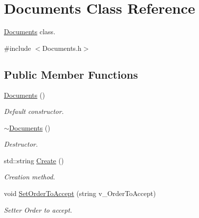 \hypertarget{class_documents}{}\section{Documents Class Reference}
\label{class_documents}


\hyperlink{class_documents}{Documents} class.  




{\ttfamily \#include $<$Documents.\+h$>$}

\subsection*{Public Member Functions}
\begin{DoxyCompactItemize}
\item 
\mbox{\label{class_documents_a52daba61782250a38f4964910a961793}} 
\hyperlink{class_documents_a52daba61782250a38f4964910a961793}{Documents} ()
\begin{DoxyCompactList}\small\item\em Default constructor. \end{DoxyCompactList}\item 
\mbox{\label{class_documents_a67e92e6e30aeff0300ac69e55bd2aab0}} 
\hyperlink{class_documents_a67e92e6e30aeff0300ac69e55bd2aab0}{$\sim$\+Documents} ()
\begin{DoxyCompactList}\small\item\em Destructor. \end{DoxyCompactList}\item 
\mbox{\label{class_documents_a524740a8fbe3933562d63c9999c0cb53}} 
std\+::string \hyperlink{class_documents_a524740a8fbe3933562d63c9999c0cb53}{Create} ()
\begin{DoxyCompactList}\small\item\em Creation method. \end{DoxyCompactList}\item 
\mbox{\label{class_documents_aa101f46efd37c76443f90822407bcaa3}} 
void \hyperlink{class_documents_aa101f46efd37c76443f90822407bcaa3}{Set\+Order\+To\+Accept} (string v\+\_\+\+Order\+To\+Accept)
\begin{DoxyCompactList}\small\item\em Setter Order to accept. \end{DoxyCompactList}\item 

\end{DoxyCompactItemize}
